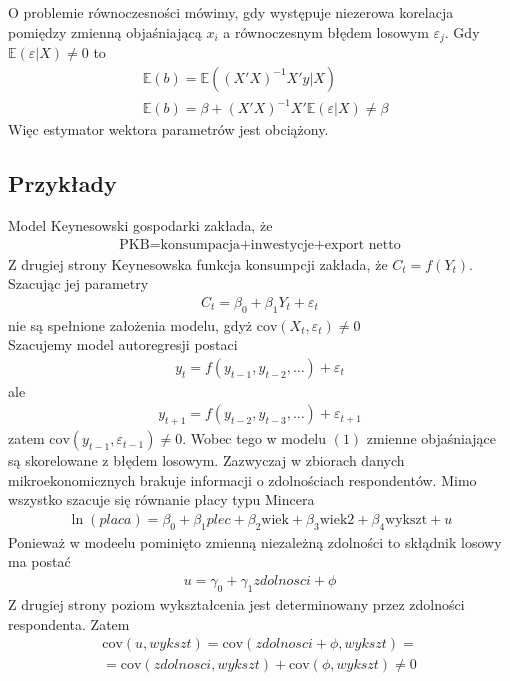 O problemie równoczesności mówimy, gdy występuje niezerowa korelacja pomiędzy zmienną objaśniającą $ x_i $ a równoczesnym błędem losowym $ \varepsilon_j $. Gdy $ \mathbb E \left(\varepsilon|X\right) \neq0$ to
\begin{align*}
&\mathbb E (b)=\mathbb E \left(\left(X'X\right)^{-1}X'y|X\right)\\
&\mathbb E (b)=\beta+\left(X'X\right)^{-1}X'\mathbb E \left(\varepsilon|X\right)\neq\beta
\end{align*}
Więc estymator wektora parametrów jest obciążony.

\subsection{Przykłady}
Model Keynesowski gospodarki zakłada, że\begin{gather*}
\text{PKB=konsumpacja+inwestycje+export netto}
\end{gather*}
Z drugiej strony Keynesowska funkcja konsumpcji zakłada, że $ C_t=f(Y_t) $. Szacując jej parametry
\begin{gather*}
C_t=\beta_0+\beta_1Y_t+\varepsilon_t
\end{gather*}
nie są spełnione założenia modelu, gdyż $ \text{cov}\left(X_t,\varepsilon_t\right) \neq0$\\
Szacujemy model autoregresji postaci
\begin{gather*}
y_t=f\left(y_{t-1},y_{t-2},\dots\right)+\varepsilon_t
\end{gather*}
ale
\begin{gather*}
y_{t+1}=f\left(y_{t-2},y_{t-3},\dots\right)+\varepsilon_{t+1}
\end{gather*}
zatem $ \text{cov}\left(y_{t-1},\varepsilon_{t-1}\right) \neq0$. Wobec tego w modelu $ (1) $ zmienne objaśniające są skorelowane z błędem losowym. Zazwyczaj w zbiorach danych mikroekonomicznych brakuje informacji o zdolnościach respondentów. Mimo wszystko szacuje się równanie płacy typu Mincera
\begin{gather*}
\ln\left(placa\right)=\beta_0+\beta_1plec+\beta_2\text{wiek}+\beta_3\text{wiek2}+\beta_4\text{wykszt}+u
\end{gather*}
Ponieważ w modeelu pominięto zmienną niezależną zdolności to skłądnik losowy ma postać
\begin{gather*}
u=\gamma_0+\gamma_1zdolnosci+\phi
\end{gather*}
Z drugiej strony poziom wykształcenia jest determinowany przez zdolności respondenta. Zatem
\begin{gather*}
\text{cov}(u,wykszt)=\text{cov}(zdolnosci+\phi,wykszt)=\\=
\text{cov}(zdolnosci,wykszt)+\text{cov}(\phi,wykszt)\neq0
\end{gather*}

